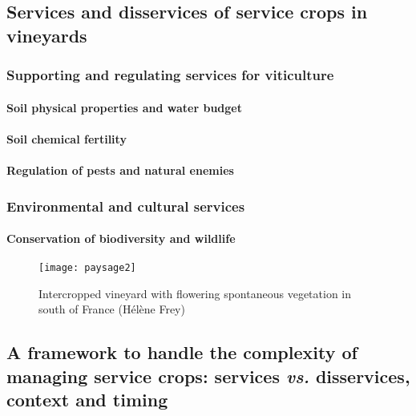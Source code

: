 \subsection{Services and disservices of service crops in vineyards}

\subsubsection{Supporting and regulating services for viticulture}

\paragraph{Soil physical properties and water budget}

\paragraph{Soil chemical fertility}

\paragraph{Regulation of pests and natural enemies}

\subsubsection{Environmental and cultural services}

\paragraph{Conservation of biodiversity and wildlife}	

\begin{figure}[htb]
	\begin{center}
		\texttt{[image: paysage2]}
			\caption[Intercropped vineyard with flowering spontaneous vegetation in south of France]{Intercropped vineyard with flowering spontaneous vegetation in south of France (\textcopyright Hélène Frey)}
		\label{c1:fig7}
       \end{center}
\end{figure}

\subsection{A framework to handle the complexity of managing service crops: services \textit{vs.} disservices, context and timing}
